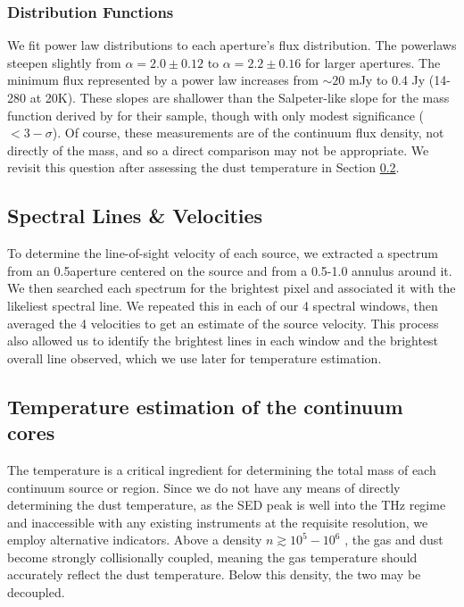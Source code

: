 \documentclass{aa}
\begin{document}
\subsubsection{Distribution Functions}
We fit power law distributions to each aperture's flux distribution.  The
powerlaws steepen slightly from $\alpha=2.0\pm0.12$ to $\alpha=2.2\pm0.16$ for
larger apertures.  The minimum flux represented by a power law increases from
$\sim20$ mJy to 0.4 Jy (14-280 \msun at 20K).  These slopes are shallower than 
the Salpeter-like slope for the mass function derived by \citep{Konyves2015a}
for their sample, though with only modest significance ($<3-\sigma$).  Of
course, these measurements are of the continuum flux density, not directly of
the mass, and so a direct comparison may not be appropriate.  We revisit this
question after assessing the dust temperature in Section \ref{sec:temperature}.

\subsection{Spectral Lines \& Velocities}
To determine the line-of-sight velocity of each source, we extracted a spectrum
from an 0.5\arcsec aperture centered on the source and from a 0.5-1.0\arcsec
annulus around it.  We then searched each spectrum for the brightest pixel and
associated it with the likeliest spectral line.  We repeated this in each of
our 4 spectral windows, then averaged the 4 velocities to get an estimate of
the source velocity.   This process also allowed us to identify the brightest
lines in each window and the brightest overall line observed, which we use
later for temperature estimation.

\subsection{Temperature estimation of the continuum cores}
\label{sec:temperature}
The temperature is a critical ingredient for determining the total mass of each
continuum source or region. Since we do not have any means of directly
determining the dust temperature, as the SED peak is well into the THz regime
and inaccessible with any existing instruments at the requisite resolution, we
employ alternative indicators.  Above a density $n\gtrsim10^5-10^6$ \percc,
the gas and dust become strongly collisionally coupled, meaning the gas
temperature should accurately reflect the dust temperature.  Below this density,
the two may be decoupled.
\end{document}
